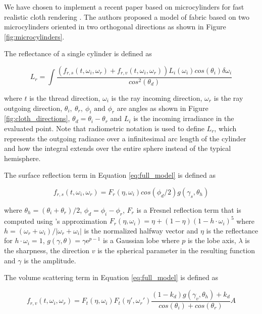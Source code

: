 \documentclass[12pt]{article}
\begin{document}
We have chosen to implement a recent paper based on microcylinders for fast realistic cloth rendering \cite{Sadeghi2013}.
The authors proposed a model of fabric based on two microcylinders oriented in two orthogonal directions as shown in Figure \ref{fig:microcylinders}.

The reflectance of a single cylinder is defined as

\begin{equation}
L_r = \int \frac{\left(f_{r,s}(t, \omega_i, \omega_r) + f_{r,v}(t,\omega_i,\omega_r)\right)L_i(\omega_i)cos(\theta_i)\delta \omega_i}{cos^2(\theta_d)}
\label{eq:full_model}
\end{equation}

where $t$ is the thread direction, $\omega_i$ is the ray incoming direction, $\omega_r$ is the ray outgoing direction, $\theta_i, ~\theta_r, ~ \phi_i \mbox{ and } \phi_r$ are angles as shown in Figure \ref{fig:cloth_directions},  $\theta_d = \theta_i-\theta_r$ and $L_i$ is the incoming irradiance in the evaluated point.
Note that radiometric notation \cite{Marschner2003} is used to define $L_r$, which represents the outgoing radiance over a infinitesimal arc length of the cylinder and how the integral extends over the entire sphere instead of the typical hemisphere.

The surface reflection term in Equation \ref{eq:full_model} is defined as

\begin{equation}
f_{r,s}(t, \omega_i, \omega_r) = F_r(\eta, \omega_i) cos(\phi_d/2)g(\gamma_s, \theta_h)
\end{equation}

where $\theta_h = (\theta_i+\theta_r)/2$, $\phi_d = \phi_i-\phi_r$, $F_r$ is a Fresnel reflection term that is computed using \citeauthor{Schlick1994}'s approximation \cite{Schlick1994} $F_r(\eta, \omega_i) = \eta + (1 - \eta)(1 - h \cdot \omega_i)^5$ where $h = (\omega_r + \omega_i)/ \left|\omega_r + \omega_i \right|$ is the normalized halfway vector and $\eta$ is the reflectance for $h \cdot \omega_i = 1$, $g(\gamma, \theta) = \gamma \mathrm{e} ^{p-1}$ is a Gaussian lobe \cite{Wang2008} where $p$ is the lobe axis, $\lambda$ is the sharpness, the direction $v$ is the spherical parameter in the resulting function and $\gamma$ is the amplitude.

The volume scattering term in Equation \ref{eq:full_model} is defined as

\begin{equation}
f_{r,v}(t,\omega_i,\omega_r) = F_t(\eta, \omega_i) F_t(\eta', \omega_r') \frac{(1-k_d)g(\gamma_v, \theta_h)+k_d}{cos(\theta_i) + cos(\theta_r)} A
\end{equation}
\end{document}
